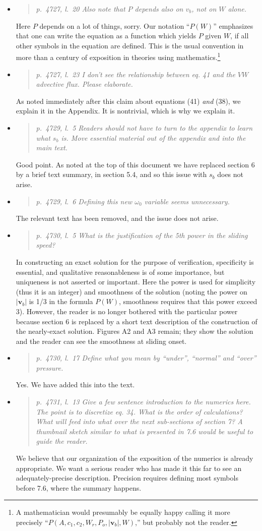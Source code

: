 \documentclass[11pt,reqno]{amsart}
\newcommand{\reply}[2]{
\medskip\medskip
\item  \begin{quote}
\emph{#1}
\end{quote}

\medskip
\noindent #2}
\begin{document}
\begin{itemize}
\reply{p.~4727, l.~20 Also note that $P$ depends also on $v_b$, not on $W$ alone.}
{Here $P$ depends on a lot of things, sorry.  Our notation ``$P(W)$'' emphasizes that one can write the equation as a function which yields $P$ given $W$, if all other symbols in the equation are defined.  This is the usual convention in more than a century of exposition in theories using mathematics.\footnote{A mathematician would presumably be equally happy calling it more precisely ``$P(A,c_1,c_2,W_r,P_o,|\mathbf{v}_b|,W)$,'' but probably not the reader.}}

\reply{p.~4727, l.~23 I don’t see the relationship between eq. 41 and the $VW$ advective flux.  Please elaborate.}
{As noted immediately after this claim about equations (41) \emph{and} (38), we explain it in the Appendix.  It is nontrivial, which is why we explain it.}

\reply{p.~4729, l.~5 Readers should not have to turn to the appendix to learn what $s_b$ is. Move essential material out of the appendix and into the main text.}
{Good point.  As noted at the top of this document we have replaced section 6 by a brief text summary, in section 5.4, and so this issue with $s_b$ does not arise.}

\reply{p.~4729, l.~6 Defining this new $\omega_0$ variable seems unnecessary.}
{The relevant text has been removed, and the issue does not arise.}

\reply{p.~4730, l.~5 What is the justification of the 5th power in the sliding speed?}
{In constructing an exact solution for the purpose of verification, specificity is essential, and qualitative reasonableness is of some importance, but uniqueness is not asserted or important.  Here the power is used for simplicity (thus it is an integer) and smoothness of the solution (noting the power on $|\mathbf{v}_b|$ is 1/3 in the formula $P(W)$, smoothness requires that this power exceed 3).  However, the reader is no longer bothered with the particular power because section 6 is replaced by a short text description of the construction of the nearly-exact solution.  Figures A2 and A3 remain; they show the solution and the reader can see the smoothness at sliding onset.}

\reply{p.~4730, l.~17 Define what you mean by ``under'', ``normal'' and ``over'' pressure.}
{Yes.  We have added this into the text.}

\reply{p.~4731, l.~13 Give a few sentence introduction to the numerics here. The point is to
discretize eq. 34. What is the order of calculations? What will feed into what over the
next sub-sections of section 7? A thumbnail sketch similar to what is presented in 7.6
would be useful to guide the reader.}
{We believe that our organization of the exposition of the numerics is already appropriate.  We want a serious reader who has made it this far to see an adequately-precise description.  Precision requires defining most symbols before 7.6, where the summary happens.}


\end{itemize}
\end{document}
